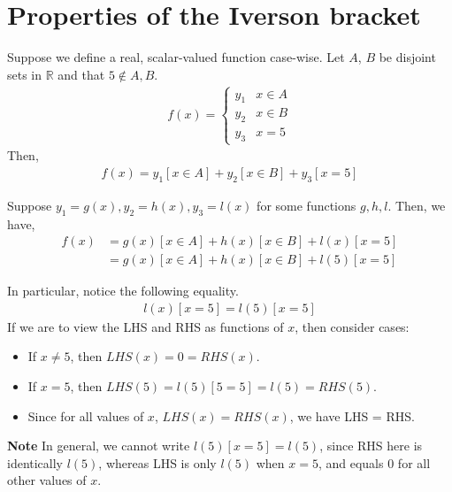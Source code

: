 \documentclass{article}
\begin{document}
\section{Properties of the Iverson bracket}
Suppose we define a real, scalar-valued function case-wise. Let $A$, $B$ be disjoint sets in $\mathbb{R}$ and that $5\not \in A, B$.
\begin{align*}
	f(x)=
	\begin{cases}
		y_1 &x\in A\\
		y_2 &x\in B\\
		y_3 &x=5
	\end{cases}
\end{align*}
Then, 
\begin{align*}
	f(x) = y_1[x\in A] + y_2[x\in B] + y_3[x=5]
\end{align*}

Suppose $y_1 = g(x), y_2 = h(x), y_3=l(x)$ for some functions $g,h,l$. Then, we have,
\begin{align*}
	f(x) &= g(x)[x\in A] + h(x)[x\in B] + l(x)[x=5]\\
	&= g(x)[x\in A] + h(x)[x\in B] + l(5)[x=5]
\end{align*}

In particular, notice the following equality.
\begin{align*}
	l(x)[x=5] = l(5)[x=5]
\end{align*}
If we are to view the LHS and RHS as functions of $x$, then consider cases:
\begin{itemize}
	\item If $x\neq 5$, then $LHS(x) = 0 = RHS(x)$.
	\item If $x=5$, then $LHS(5)=l(5)[5=5] = l(5) = RHS(5)$.
	\item Since for all values of $x$, $LHS(x)=RHS(x)$, we have LHS = RHS.
\end{itemize}

\textbf{Note} In general, we cannot write $l(5)[x=5] = l(5)$, since RHS here is identically $l(5)$, whereas LHS is only $l(5)$ when $x=5$, and equals $0$ for all other values of $x$.
\end{document}
